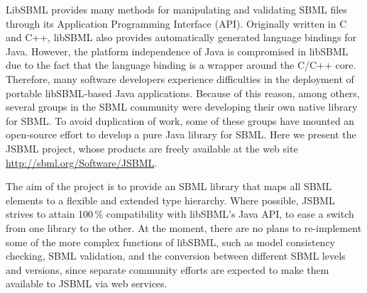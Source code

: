 \documentclass{bioinfo}
\begin{document}
LibSBML provides many methods for manipulating and validating
SBML files through its Application Programming Interface (API).
Originally written in C and C++, libSBML also provides automatically generated 
language bindings for Java\texttrademark.
However, the platform independence of Java is compromised
in libSBML due to the fact that the language binding is a
wrapper around the C/C++ core. 
Therefore, many software developers experience difficulties in
the deployment of portable libSBML-based Java applications.
Because of this reason, among others, several groups in the SBML community
were developing their own native library for SBML. To avoid duplication of
work, some of these groups have mounted an open-source effort to
develop a pure Java library for SBML. Here we present the JSBML
project, whose products are freely available at the web site
\href{http://sbml.org/Software/JSBML}{http://sbml.org/Software/JSBML}.

The aim of the project is to provide an SBML
library that maps all SBML elements to a flexible and extended
type hierarchy. Where possible, JSBML strives to attain
100\,\% compatibility with libSBML's Java API, to ease a switch from
one library to the other. At the moment, there are no plans to re-implement some
of the more complex functions of libSBML, such as model consistency checking,
SBML validation, and the conversion between different SBML levels and versions,
since separate community efforts are expected to make them
available to JSBML via web services.

\end{document}
